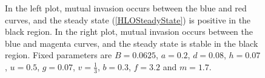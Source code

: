 \documentclass[12pt]{UOthesis}
\theoremstyle{remarkstyle}
\begin{document}
\begin{figure}[h!]
	\centering
	\caption[Mutual invasion and coexistence in the original model (periodic orbit)]{In the left plot, mutual invasion occurs between the blue and red curves, and the steady state (\ref{HLOSteadyState}) is positive in the black region. In the right plot, mutual invasion occurs between the blue and magenta curves, and the steady state is stable in the black region. Fixed parameters are $B=0.0625$, $a=0.2$, $d=0.08$, $h=0.07$, $u=0.5$, $g=0.07$, $v=\frac{1}{3}$, $b=0.3$, $f=3.2$ and $m=1.7$.\label{HLOSSMutualInvasionOnSteadyStateAndEigenvalues}}
\end{figure}
\end{document}
